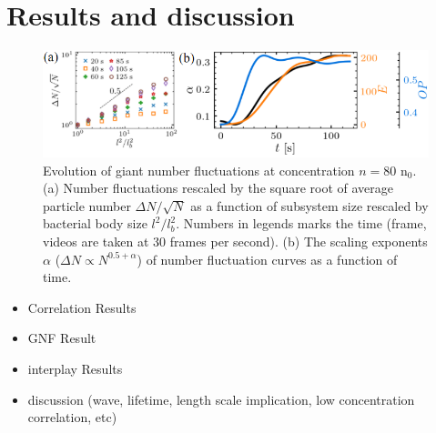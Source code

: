 \documentclass[twocolumn,aps,pre,amsmath,amssymb,floatfix,longbibliography]{revtex4-1}
\begin{document}
\section{Results and discussion}



\begin{figure}[!]\label{fig:4}
\begin{center}
\includegraphics[width=\textwidth]{GNF_figure-4-v1.png}
\caption[]{Evolution of giant number fluctuations at concentration $n=80$ n$_0$. (a) Number fluctuations rescaled by the square root of average particle number $\Delta N/\sqrt N$ as a function of subsystem size rescaled by bacterial body size $l^2/l_b^2$. Numbers in legends marks the time (frame, videos are taken at 30 frames per second).  (b) The scaling exponents $\alpha$ ($\Delta N \propto N^{0.5+\alpha}$) of number fluctuation curves as a function of time.}

\end{center}
\end{figure}

\begin{itemize}
\item Correlation Results
\item GNF Result
\item interplay Results
\item discussion (wave, lifetime, length scale implication, low concentration correlation, etc)
\end{itemize}
\end{document}
